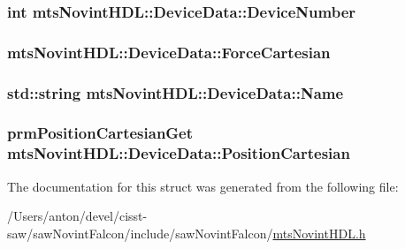 \subsubsection[{Device\+Number}]{\setlength{\rightskip}{0pt plus 5cm}int mts\+Novint\+H\+D\+L\+::\+Device\+Data\+::\+Device\+Number}\label{structmts_novint_h_d_l_1_1_device_data_a9bd1b2ab0ac17be34d64b2ad1de156a2}
\hypertarget{structmts_novint_h_d_l_1_1_device_data_a0cdc951bd1b42f4f2d600edf415ba181}{}
\subsubsection[{Force\+Cartesian}]{ mts\+Novint\+H\+D\+L\+::\+Device\+Data\+::\+Force\+Cartesian}\label{structmts_novint_h_d_l_1_1_device_data_a0cdc951bd1b42f4f2d600edf415ba181}
\hypertarget{structmts_novint_h_d_l_1_1_device_data_a680dd117f9b6f0b13ef2142d72c507ff}{}
\subsubsection[{Name}]{\setlength{\rightskip}{0pt plus 5cm}std\+::string mts\+Novint\+H\+D\+L\+::\+Device\+Data\+::\+Name}\label{structmts_novint_h_d_l_1_1_device_data_a680dd117f9b6f0b13ef2142d72c507ff}
\hypertarget{structmts_novint_h_d_l_1_1_device_data_ac93b06cca79ba9eeb52df9d2f0931276}{}
\subsubsection[{Position\+Cartesian}]{\setlength{\rightskip}{0pt plus 5cm}prm\+Position\+Cartesian\+Get mts\+Novint\+H\+D\+L\+::\+Device\+Data\+::\+Position\+Cartesian}\label{structmts_novint_h_d_l_1_1_device_data_ac93b06cca79ba9eeb52df9d2f0931276}


The documentation for this struct was generated from the following file\+:\begin{DoxyCompactItemize}
\item 
/\+Users/anton/devel/cisst-\/saw/saw\+Novint\+Falcon/include/saw\+Novint\+Falcon/\hyperlink{mts_novint_h_d_l_8h}{mts\+Novint\+H\+D\+L.\+h}\end{DoxyCompactItemize}
